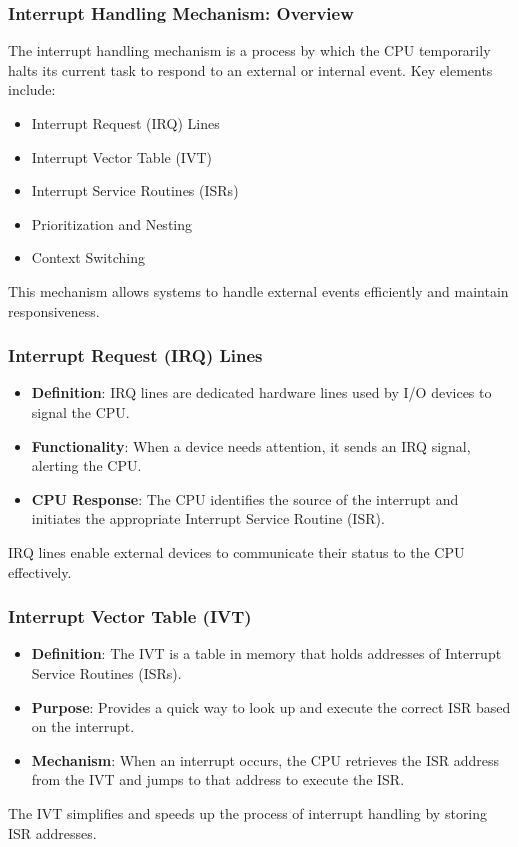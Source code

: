 \begin{frame}
    \frametitle{Interrupt Handling Mechanism: Overview}

    The interrupt handling mechanism is a process by which the CPU temporarily halts its current task to respond to an external or internal event. Key elements include:
    \begin{itemize}
        \item Interrupt Request (IRQ) Lines
        \item Interrupt Vector Table (IVT)
        \item Interrupt Service Routines (ISRs)
        \item Prioritization and Nesting
        \item Context Switching
    \end{itemize}

    \bigskip
    This mechanism allows systems to handle external events efficiently and maintain responsiveness.
\end{frame}

\begin{frame}
    \frametitle{Interrupt Request (IRQ) Lines}

    \begin{itemize}
        \item \textbf{Definition}: IRQ lines are dedicated hardware lines used by I/O devices to signal the CPU.
        \item \textbf{Functionality}: When a device needs attention, it sends an IRQ signal, alerting the CPU.
        \item \textbf{CPU Response}: The CPU identifies the source of the interrupt and initiates the appropriate Interrupt Service Routine (ISR).
    \end{itemize}

    \bigskip
    IRQ lines enable external devices to communicate their status to the CPU effectively.
\end{frame}

\begin{frame}
    \frametitle{Interrupt Vector Table (IVT)}

    \begin{itemize}
        \item \textbf{Definition}: The IVT is a table in memory that holds addresses of Interrupt Service Routines (ISRs).
        \item \textbf{Purpose}: Provides a quick way to look up and execute the correct ISR based on the interrupt.
        \item \textbf{Mechanism}: When an interrupt occurs, the CPU retrieves the ISR address from the IVT and jumps to that address to execute the ISR.
    \end{itemize}

    \bigskip
    The IVT simplifies and speeds up the process of interrupt handling by storing ISR addresses.
\end{frame}


